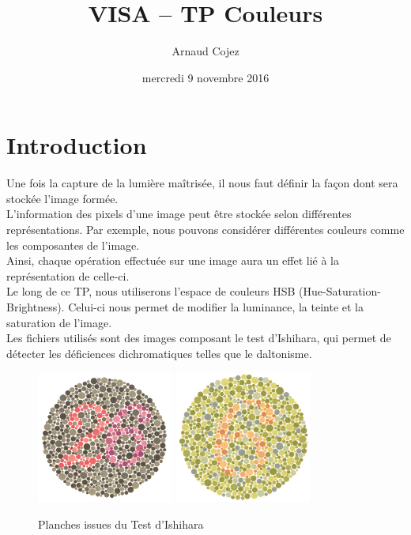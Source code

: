 \documentclass[a4paper]{article}
\begin{document}
\title{VISA -- TP Couleurs}
\author{Arnaud Cojez}
\date{mercredi 9 novembre 2016}

\maketitle

\newpage
\tableofcontents
\newpage

\section{Introduction}
Une fois la capture de la lumière maîtrisée, il nous faut définir la façon dont sera stockée l'image formée.\\
L'information des pixels d'une image peut être stockée selon différentes représentations. Par exemple, nous pouvons considérer différentes couleurs comme les composantes de l'image.\\
Ainsi, chaque opération effectuée sur une image aura un effet lié à la représentation de celle-ci.\\

Le long de ce TP, nous utiliserons l'espace de couleurs HSB (Hue-Saturation-Brightness). Celui-ci nous permet de modifier la luminance, la teinte et la saturation de l'image.\\
Les fichiers utilisés sont des images composant le test d'Ishihara, qui permet de détecter les déficiences dichromatiques telles que le daltonisme.

\begin{figure}[H]
\begin{center}
\includegraphics[width=170px]{../base/cas_1_dalton26.png}
\includegraphics[width=170px]{../base/cas_4_dalton6.png}
\end{center}
\caption{Planches issues du Test d'Ishihara}
\end{figure}
\end{document}
